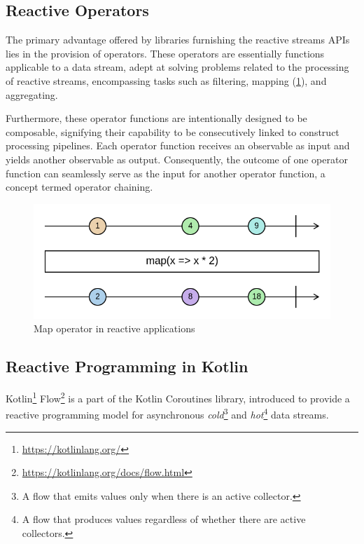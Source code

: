 \documentclass[12pt,a4paper,openright,twoside]{book}
\begin{document}
\subsection{Reactive Operators}

The primary advantage offered by libraries furnishing the reactive streams APIs lies in the provision of operators. These operators are essentially functions applicable to a data stream, adept at solving problems related to the processing of reactive streams, encompassing tasks such as filtering, mapping (\cref{fig:reactive-map}), and aggregating.

Furthermore, these operator functions are intentionally designed to be composable, signifying their capability to be consecutively linked to construct processing pipelines. Each operator function receives an observable as input and yields another observable as output. Consequently, the outcome of one operator function can seamlessly serve as the input for another operator function, a concept termed operator chaining.

\begin{figure}
    \centering
    \includegraphics[width=\linewidth]{figures/map-marble.png}
    \caption{Map operator in reactive applications}
    \label{fig:reactive-map}
\end{figure}

\subsection{Reactive Programming in Kotlin}

Kotlin\footnote{\url{https://kotlinlang.org/}} Flow\footnote{\url{https://kotlinlang.org/docs/flow.html}} is a part of the Kotlin Coroutines library, introduced to provide a reactive programming model for asynchronous \textit{cold}\footnote{A flow that emits values only when there is an active collector.} and \textit{hot}\footnote{A flow that produces values regardless of whether there are active collectors.} data streams.
\end{document}
